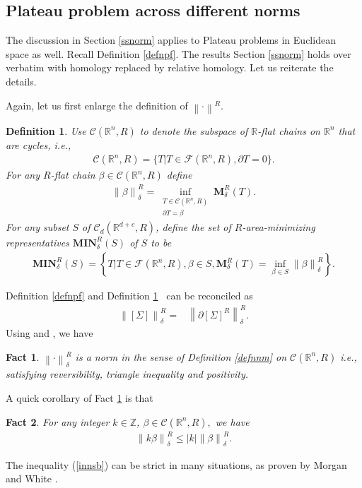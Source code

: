 \documentclass[11pt,a4paper]{amsart}
\numberwithin{equation}{section}
\newcommand{\mn}{\mathbf{MIN}}
\newcommand{\be}{\beta}
\newcommand{\de}{\delta}
\newcommand{\Si}{\Sigma}
\newcommand{\ms}{\mathbf{M}}
\newcommand{\no}[1]{\left\lVert#1\right\rVert}
\newcommand{\pd}{\partial}
\newcommand{\R}{\mathbb{R}}
\newcommand{\Z}{\mathbb{Z}}
\theoremstyle{plain}
\newtheorem{fact}{Fact}[subsection]
\newtheorem{defn}{Definition}[subsection]
\theoremstyle{definition}
\numberwithin{equation}{subsection}
\begin{document}
	\subsection{Plateau problem across different norms}
	The discussion in Section \ref{ssnorm} applies to Plateau problems in Euclidean space as well. Recall Definition \ref{defnpf}. The results Section \ref{ssnorm} holds over verbatim with homology replaced by relative homology. Let us reiterate the details.
	
Again, let us first enlarge the definition of $\no{\cdot}^R.$ 
	\begin{defn}\label{defnrareaallb}
Use $\mathcal{C}(\R^n,R)$ to denote the subspace of $\R$-flat chains on $\R^n$ that are cycles, i.e., \begin{align*}
	\mathcal{C}(\R^n,R)=\{T|T\in\mathcal{F}(\R^n,R),\pd T=0\}.
\end{align*}		For any $R$-flat chain $\beta\in \mathcal{C}(\R^n,R)$ define	\begin{align}\label{defnrallb}
			\no{\be}^R_\de=\inf_{\substack{T\in\mathcal{C}(\R^n,R)\\ \pd T=\be}}\ms^R_\de(T).
		\end{align}
For any subset $S$ of $\mathcal{C}_d(\R^{d+c},R)$, define the set of $R$-area-minimizing representatives $\mn^R_\de(S)$ of $S$ to be
\begin{align*}
	\mn^R_\de\left(S\right)=\left\{T\bigg|T\in\mathcal{F}(\R^n,R),\be\in S,\ms^R_\de(T)=\inf_{\be\in S}\no{\be}^R_\de\right\}.
	\end{align*} 	\end{defn}	
	Definition \ref{defnpf} and Definition \ref{defnrareaallb}  can be reconciled as
	\begin{align*}
		\no{[\Si]}^R_\de=&\no{\pd[\Si]^R}^R_\de.
	\end{align*}
	Using \cite{HFrf} and \cite[Chapter 5]{HF}, we have
	\begin{fact}\label{factnormb}
		$\no{\cdot}^R_\de$ is a norm in the sense of Definition \ref{defnnm} on $\mathcal{C}(\R^n,R)$ i.e., satisfying reversibility, triangle inequality and positivity.
	\end{fact} 	
		A quick corollary of Fact \ref{factnormb} is that
	\begin{fact}
		For any integer $k\in \Z$, $\be\in\mathcal{C}(\R^n,R),$ we have
		\begin{align}\label{innsb}
			\no{k\be}^R_\de\le |k|\no{\be}^R_\de.
		\end{align}
	\end{fact}
	The inequality (\ref{innsb}) can be strict in many situations, as proven by Morgan \cite{FMmc} and White \cite{BWmc}.
	
\end{document}
